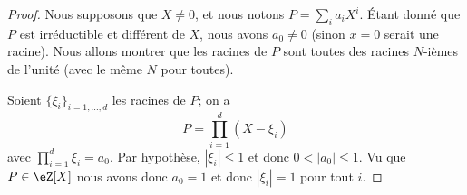 \begin{proof}
    Nous supposons que \( X\neq 0\), et nous notons \( P=\sum_ia_iX^i\). Étant donné que \( P\) est irréductible et différent de \( X\), nous avons \( a_0\neq 0\) (sinon \( x=0\) serait une racine). Nous allons montrer que les racines de \( P\) sont toutes des racines \( N\)-ièmes de l'unité (avec le même \( N\) pour toutes).

    Soient \( \{ \xi_i \}_{i=1,\ldots, d}\) les racines de \( P\); on a
    \begin{equation}
        P=\prod_{i=1}^d(X-\xi_i)
    \end{equation}
    avec \( \prod_{i=1}^d\xi_i=a_0\). Par hypothèse, \( | \xi_i |\leq 1\) et donc \( 0<| a_0 |\leq 1\). Vu que \( P\in \eZ[X]\) nous avons donc \( a_0=1\) et donc \( | \xi_i |=1\) pour tout \( i\).


\end{proof}
